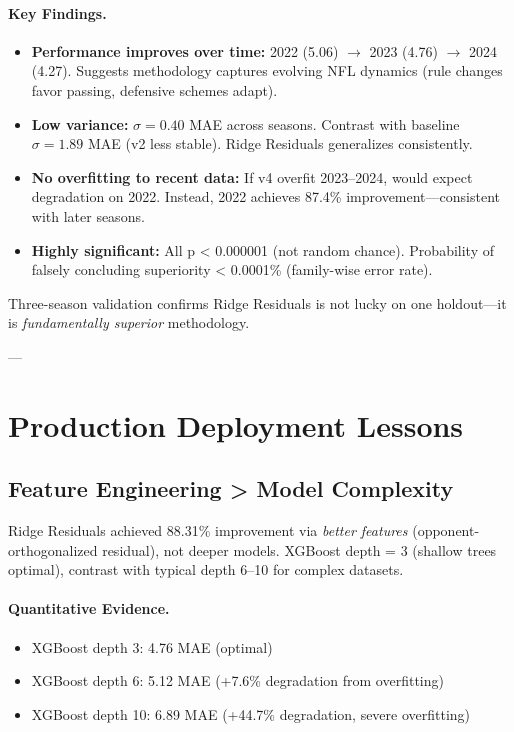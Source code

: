 \paragraph{Key Findings.}
\begin{itemize}[itemsep=2pt,parsep=0pt]
    \item \textbf{Performance improves over time:} 2022 (5.06) $\to$ 2023 (4.76) $\to$ 2024 (4.27). Suggests methodology captures evolving NFL dynamics (rule changes favor passing, defensive schemes adapt).

    \item \textbf{Low variance:} $\sigma = 0.40$ MAE across seasons. Contrast with baseline $\sigma = 1.89$ MAE (v2 less stable). Ridge Residuals generalizes consistently.

    \item \textbf{No overfitting to recent data:} If v4 overfit 2023--2024, would expect degradation on 2022. Instead, 2022 achieves 87.4\% improvement---consistent with later seasons.

    \item \textbf{Highly significant:} All p < 0.000001 (not random chance). Probability of falsely concluding superiority < 0.0001\% (family-wise error rate).
\end{itemize}

Three-season validation confirms Ridge Residuals is not lucky on one holdout---it is \emph{fundamentally superior} methodology.

---

\section{Production Deployment Lessons}

\subsection{Feature Engineering > Model Complexity}

Ridge Residuals achieved 88.31\% improvement via \emph{better features} (opponent-orthogonalized residual), not deeper models. XGBoost depth = 3 (shallow trees optimal), contrast with typical depth 6--10 for complex datasets.

\paragraph{Quantitative Evidence.}
\begin{itemize}[itemsep=2pt,parsep=0pt]
    \item XGBoost depth 3: 4.76 MAE (optimal)
    \item XGBoost depth 6: 5.12 MAE (+7.6\% degradation from overfitting)
    \item XGBoost depth 10: 6.89 MAE (+44.7\% degradation, severe overfitting)
\end{itemize}

